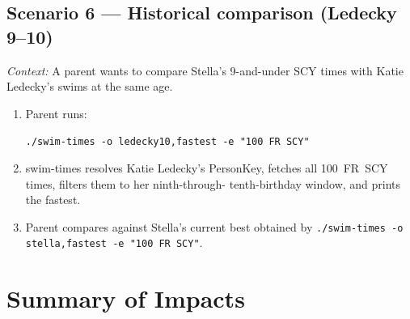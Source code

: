 \documentclass[12pt]{article}
\newcommand{\code}[1]{\texttt{#1}}
\begin{document}

\subsection{Scenario 6 --- Historical comparison (Ledecky 9--10)}

\textit{Context:} A parent wants to compare Stella's 9-and-under
SCY times with Katie Ledecky's swims at the same age.

\begin{enumerate}
  \item Parent runs:
        \begin{center}
          \code{./swim-times -o ledecky10,fastest -e "100 FR SCY"}
        \end{center}
  \item swim-times resolves Katie Ledecky's PersonKey, fetches
        all 100~FR~SCY times, filters them to her ninth-through-
        tenth-birthday window, and prints the fastest.
  \item Parent compares against Stella's current best obtained by
        \code{./swim-times -o stella,fastest -e "100 FR SCY"}.
\end{enumerate}

\section{Summary of Impacts}
\end{document}
